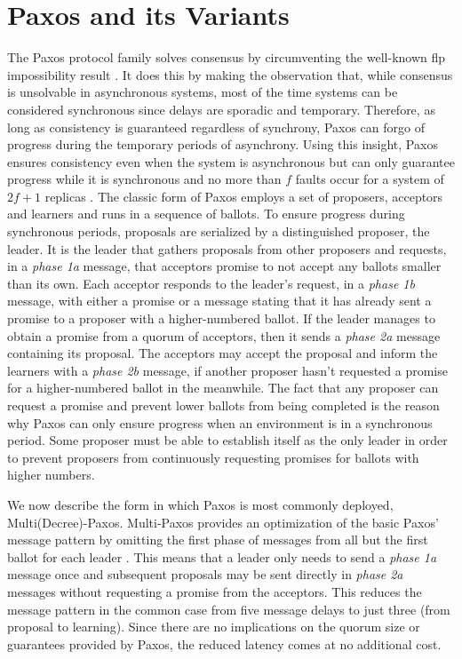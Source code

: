 \section{Paxos and its Variants} \label{Paxos} 
The Paxos protocol family solves consensus by circumventing the well-known \acrshort{flp} impossibility result \cite{Fischer1985}. It does this by making the observation that, while consensus is unsolvable in asynchronous systems, most of the time systems can be considered synchronous since delays are sporadic and temporary. Therefore, as long as consistency is guaranteed regardless of synchrony, Paxos can forgo of progress during the temporary periods of asynchrony. Using this insight, Paxos ensures consistency even when the system is asynchronous but can only guarantee progress while it is synchronous and no more than $f$ faults occur for a system of $2f+1$ replicas \cite{Lamport2001}. The classic form of Paxos employs a set of proposers, acceptors and learners and runs in a sequence of ballots. To ensure progress during synchronous periods, proposals are serialized by a distinguished proposer, the leader. It is the leader that gathers proposals from other proposers and requests, in a \textit{phase 1a} message, that acceptors promise to not accept any ballots smaller than its own. Each acceptor responds to the leader's request, in a \textit{phase 1b} message, with either a promise or a message stating that it has already sent a promise to a proposer with a higher-numbered ballot. If the leader manages to obtain a promise from a quorum of acceptors, then it sends a \textit{phase 2a} message containing its proposal. The acceptors may accept the proposal and inform the learners with a \textit{phase 2b} message, if another proposer hasn't requested a promise for a higher-numbered ballot in the meanwhile. The fact that any proposer can request a promise and prevent lower ballots from being completed is the reason why Paxos can only ensure progress when an environment is in a synchronous period. Some proposer must be able to establish itself as the only leader in order to prevent proposers from continuously requesting promises for ballots with higher numbers. \par
We now describe the form in which Paxos is most commonly deployed, Multi(Decree)-Paxos. Multi-Paxos provides an optimization of the basic Paxos' message pattern by omitting the first phase of messages from all but the first ballot for each leader \cite{Renesse2011}. This means that a leader only needs to send a \textit{phase 1a} message once and subsequent proposals may be sent directly in \textit{phase 2a} messages without requesting a promise from the acceptors. This reduces the message pattern in the common case from five message delays to just three (from proposal to learning). Since there are no implications on the quorum size or guarantees provided by Paxos, the reduced latency comes at no additional cost. \par
